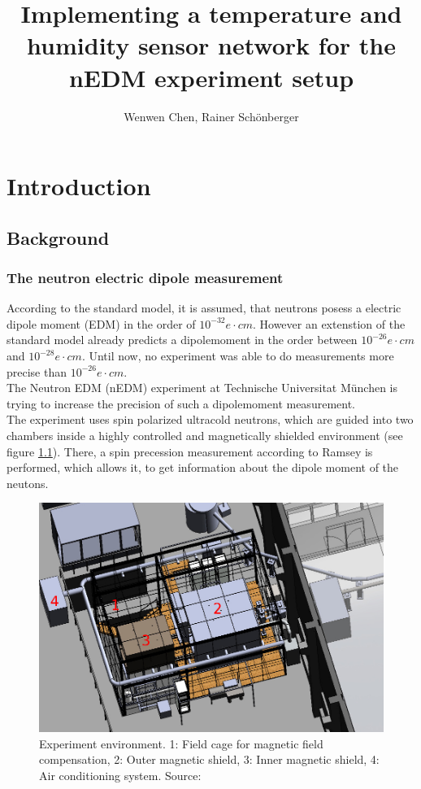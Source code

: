 \documentclass[a4paper]{scrreprt}
\title{Implementing a temperature and humidity sensor network for the nEDM
experiment setup}
\author{Wenwen Chen, Rainer Schönberger}
\begin{document}
\maketitle
\tableofcontents
\chapter{Introduction}
\section{Background}
\subsection{The neutron electric dipole measurement}
According to the standard model, it is assumed, that neutrons posess a electric dipole moment (EDM)
in the order of $10^{-32}e\cdot cm$. However an extenstion of the standard model already predicts
a dipolemoment in the order between $10^{-26}e\cdot cm$ and $10^{-28}e\cdot cm$. Until now, no
experiment was able to do measurements more precise than $10^{-26}e\cdot cm$\cite{frmexp}.\\
The Neutron EDM (nEDM) experiment at Technische Universitat München is trying to increase the precision
of such a dipolemoment measurement\cite{frmexp}.\\
The experiment uses spin polarized ultracold neutrons, which are guided into two chambers inside a
highly controlled and magnetically shielded environment (see figure \ref{fig:exp}). There, a spin precession measurement according
to Ramsey \cite{ramsey} is performed, which allows it, to get information about the dipole moment of the neutons.
\begin{figure}[h]
\centering
\includegraphics[width=0.87\linewidth]{img/frm3d.jpg}
\caption{Experiment environment. 1: Field cage for magnetic field compensation, 2: Outer magnetic shield, 3: Inner magnetic shield, 4: Air conditioning system. Source: \cite{fiewiki}}
\label{fig:exp}
\end{figure}
\end{document}
